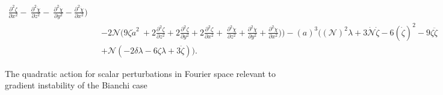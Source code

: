 \documentclass[%
 reprint,
 amsmath,amssymb,
 aps,
]{revtex4-1}
\begin{document}
\begin{widetext}
\begin{small}
\begin{eqnarray}
\frac{\partial^{2}\zeta}{\partial x^{2}} -  \
\frac{\partial^{2}\dot{\chi}}{\partial z^{2}} -  \
\frac{\partial^{2}\dot{\chi}}{\partial y^{2}} \nonumber -  \frac{\partial^{2}\dot{\chi}}{\partial x^{2}})\\
&& - 2 \mathcal{N} \bigl(9 \zeta \dot{a}^2 \
+ 2 \frac{\partial^{2}\zeta}{\partial z^{2}} + 2 \frac{\partial^{2}\zeta}{\partial y^{2}} \nonumber  + 2 \frac{\partial^{2}\zeta}{\partial x^{2}} + \
\frac{\partial^{2}\dot{\chi}}{\partial z^{2}} + \frac{\partial^{2}\dot{\chi}}{\partial y^{2}} + \frac{\partial^{2}\dot{\chi}}{\partial x^{2}}\bigr)\Bigr) \nonumber -  (\mathit{a})^3 \bigl((\mathcal{N})^2 \lambda + 3 \dot{\mathcal{N}} \dot{\zeta}- 6 (\dot{\zeta})^2 - 9 \zeta \ddot{\zeta} \nonumber \\
&& + \mathcal{N} (-2 \delta \lambda - 6 \zeta \lambda + 3\ddot{\zeta})\nonumber \bigr).
\end{eqnarray}
\end{small}
\end{widetext}
The quadratic action for scalar perturbations in Fourier space relevant to gradient instability of the Bianchi case
\end{document}
